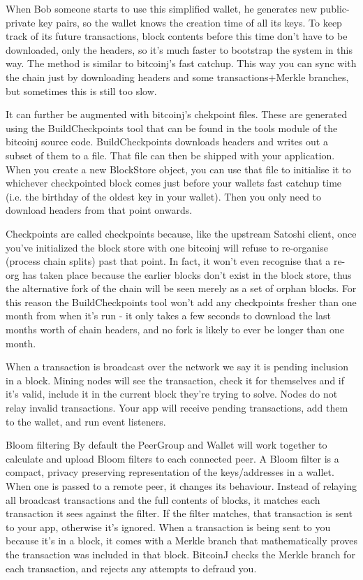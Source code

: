 \documentclass[a4paper,12pt]{article}
\begin{document}
When Bob someone starts to use this simplified wallet, he generates new public-private key pairs, so the wallet knows the creation time of all its keys. To keep track of its future transactions, block contents before this time don't have to be downloaded, only the headers, so it's much faster to bootstrap the system in this way. The method is similar to bitcoinj's fast catchup. This way you can sync with the chain just by downloading headers and some transactions+Merkle branches, but sometimes this is still too slow. 


It can further be augmented with bitcoinj's chekpoint files. These are generated using the BuildCheckpoints tool that can be found in the tools module of the bitcoinj source code. BuildCheckpoints downloads headers and writes out a subset of them to a file. That file can then be shipped with your application. When you create a new BlockStore object, you can use that file to initialise it to whichever checkpointed block comes just before your wallets fast catchup time (i.e. the birthday of the oldest key in your wallet). Then you only need to download headers from that point onwards.

Checkpoints are called checkpoints because, like the upstream Satoshi client, once you've initialized the block store with one bitcoinj will refuse to re-organise (process chain splits) past that point. In fact, it won't even recognise that a re-org has taken place because the earlier blocks don't exist in the block store, thus the alternative fork of the chain will be seen merely as a set of orphan blocks. For this reason the BuildCheckpoints tool won't add any checkpoints fresher than one month from when it's run - it only takes a few seconds to download the last months worth of chain headers, and no fork is likely to ever be longer than one month.

When a transaction is broadcast over the network we say it is pending inclusion in a block. Mining nodes will see the transaction, check it for themselves and if it's valid, include it in the current block they're trying to solve. Nodes do not relay invalid transactions. Your app will receive pending transactions, add them to the wallet, and run event listeners. 


Bloom filtering
By default the PeerGroup and Wallet will work together to calculate and upload Bloom filters to each connected peer. A Bloom filter is a compact, privacy preserving representation of the keys/addresses in a wallet. When one is passed to a remote peer, it changes its behaviour. Instead of relaying all broadcast transactions and the full contents of blocks, it matches each transaction it sees against the filter. If the filter matches, that transaction is sent to your app, otherwise it's ignored. When a transaction is being sent to you because it's in a block, it comes with a Merkle branch that mathematically proves the transaction was included in that block. BitcoinJ checks the Merkle branch for each transaction, and rejects any attempts to defraud you.
\end{document}
